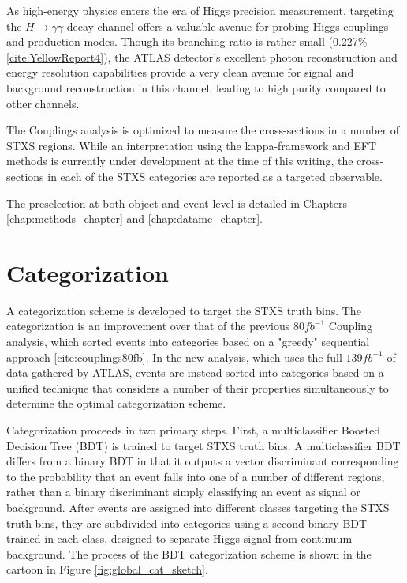 
As high-energy physics enters the era of Higgs precision measurement, targeting the $H \rightarrow \gamma \gamma$ decay channel offers a valuable avenue for probing Higgs couplings and production modes. Though its branching ratio is rather small (0.227\% \ref{cite:YellowReport4}), the ATLAS detector's excellent photon reconstruction and energy resolution capabilities provide a very clean avenue for signal and background reconstruction in this channel, leading to high purity compared to other channels.

The Couplings analysis is optimized to measure the cross-sections in a number of STXS regions. While an interpretation using the kappa-framework and EFT methods is currently under development at the time of this writing, the cross-sections in each of the STXS categories are reported as a targeted observable.

The preselection at both object and event level is detailed in Chapters \ref{chap:methods_chapter} and \ref{chap:datamc_chapter}.

\section{Categorization} \label{sec:Categorization} 

A categorization scheme is developed to target the STXS truth bins. The categorization is an improvement over that of the previous $80 fb^{-1}$ Coupling analysis, which sorted events into categories based on a "greedy" sequential approach \ref{cite:couplings80fb}. In the new analysis, which uses the full $139 fb^{-1}$ of data gathered by ATLAS, events are instead sorted into categories based on a unified technique that considers a number of their properties simultaneously to determine the optimal categorization scheme.

Categorization proceeds in two primary steps. First, a multiclassifier Boosted Decision Tree (BDT) is trained to target STXS truth bins. A multiclassifier BDT differs from a binary BDT in that it outputs a vector discriminant corresponding to the probability that an event falls into one of a number of different regions, rather than a binary discriminant simply classifying an event as signal or background. After events are assigned into different classes targeting the STXS truth bins, they are subdivided into categories using a second binary BDT trained in each class, designed to separate Higgs signal from continuum background. The process of the BDT categorization scheme is shown in the cartoon in Figure \ref{fig:global_cat_sketch}.

